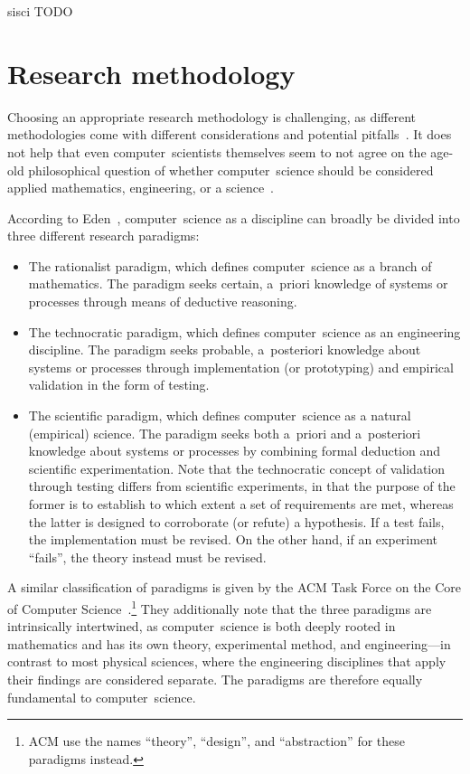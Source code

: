 \gls{sisci}
TODO

\section{Research methodology}\label{sec:methodology}
Choosing an appropriate research methodology is challenging, as different methodologies come with different considerations and potential pitfalls~\cite{McGrath1981}.
%
It does not help that even computer~scientists themselves seem to not agree on the age-old philosophical question of whether computer~science should be considered applied mathematics, engineering, or a science~\cite{Denning2005}.


According to Eden~\cite{Eden2007}, computer~science as a discipline can broadly be divided into three different research paradigms:
\begin{itemize}
    \item The rationalist paradigm, which defines computer~science as a branch of mathematics. 
        The paradigm seeks certain, a~priori knowledge of systems or processes through means of deductive reasoning.
    \item The technocratic paradigm, which defines computer~science as an engineering discipline.
        The paradigm seeks probable, a~posteriori knowledge about systems or processes through implementation (or prototyping) and empirical validation in the form of testing.
    \item The scientific paradigm, which defines computer~science as a natural (empirical) science.
        The paradigm seeks both a~priori and a~posteriori knowledge about systems or processes by combining formal deduction and scientific experimentation.
        Note that the technocratic concept of validation through testing differs from scientific experiments, in that the purpose of the former is to establish to which extent a set of requirements are met, whereas the latter is designed to corroborate (or refute) a hypothesis.
        If a test fails, the implementation must be revised. 
        On the other hand, if an experiment ``fails'', the theory instead must be revised.
\end{itemize}
%
A similar classification of paradigms is given by the ACM Task Force on the Core of Computer Science~\cite{Comer1989}.\footnote{ACM use the names ``theory'', ``design'', and ``abstraction'' for these paradigms instead.}
%
They additionally note that the three paradigms are intrinsically intertwined, as computer~science is both deeply rooted in mathematics and has its own theory, experimental method, and engineering---in contrast to most physical sciences, where the engineering disciplines that apply their findings are considered separate.
%
The paradigms are therefore equally fundamental to computer~science.



